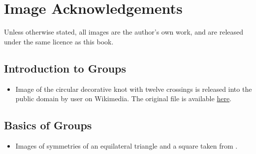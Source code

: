 \chapter{Image Acknowledgements}
Unless otherwise stated, all images are the author's own work, and are released under the same licence as this book.

\section{Introduction to Groups}
\begin{itemize}
    \item Image of the circular decorative knot with twelve crossings is released into the public domain by user  on Wikimedia. The original file is available \href{https://commons.wikimedia.org/wiki/File:Circular-cross-decorative-knot-12crossings.svg}{here}.
\end{itemize}

\section{Basics of Groups}
\begin{itemize}
    \item Images of symmetries of an equilateral triangle and a square taken from \cite[p. 13]{milne_2021}.
\end{itemize}
